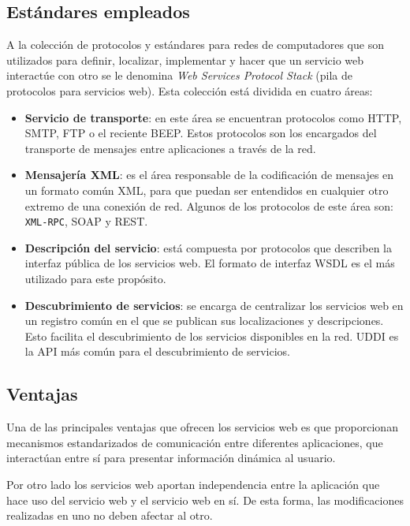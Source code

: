   \subsection{Estándares empleados}
A la colección de protocolos y estándares para redes de computadores que son
utilizados para definir, localizar, implementar y hacer que un servicio web
interactúe con otro se le denomina \emph{Web Services Protocol Stack} (pila
de protocolos para servicios web). Esta colección está dividida en cuatro
áreas:
\begin{itemize}
\item \textbf{Servicio de transporte}: en este área se encuentran protocolos
como \acs{HTTP}, \acs{SMTP}, \acs{FTP} o el reciente \acs{BEEP}. Estos
protocolos son los encargados del transporte de mensajes entre aplicaciones
a través de la red.
\item \textbf{Mensajería \acs{XML}}: es el área responsable de la codificación
de mensajes en un formato común \acs{XML}, para que puedan ser entendidos
en cualquier otro extremo de una conexión de red. Algunos de los protocolos
de este área son: \texttt{XML-RPC}, \acs{SOAP} y \acs{REST}.
\item \textbf{Descripción del servicio}: está compuesta por protocolos que
describen la interfaz pública de los servicios web. El formato de interfaz
\acs{WSDL} es el más utilizado para este propósito.
\item \textbf{Descubrimiento de servicios}: se encarga de centralizar los
servicios web en un registro común en el que se publican sus localizaciones
y descripciones. Esto facilita el descubrimiento de los servicios disponibles
en la red. \acs{UDDI} es la \acs{API} más común para el descubrimiento de 
servicios.
\end{itemize}

  \subsection{Ventajas}

Una de las principales ventajas que ofrecen los servicios web es que 
proporcionan mecanismos estandarizados de comunicación entre diferentes
aplicaciones, que interactúan entre sí para presentar información dinámica al 
usuario.

Por otro lado los servicios web aportan independencia entre la 
aplicación que hace uso del servicio web y el servicio web en sí. De esta 
forma, las modificaciones realizadas en uno no deben afectar al otro.

